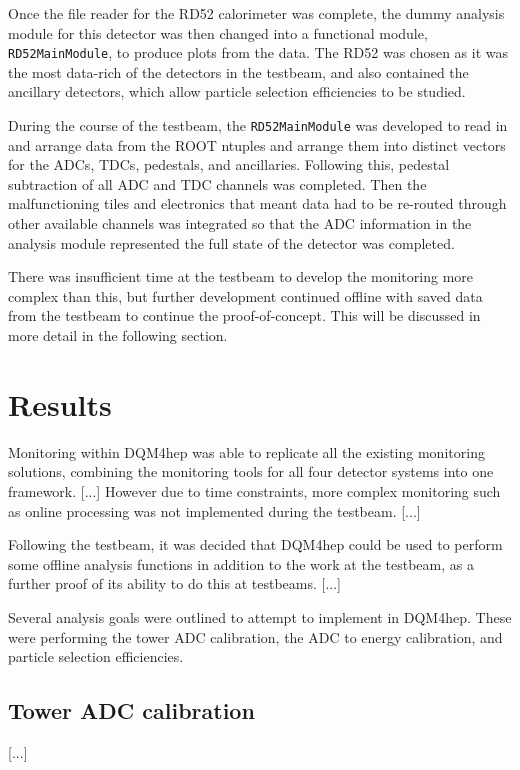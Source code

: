 Once the file reader for the RD52 calorimeter was complete, the dummy analysis module for this detector was then changed into a functional module, \texttt{RD52MainModule}, to produce plots from the data. The RD52 was chosen as it was the most data-rich of the detectors in the testbeam, and also contained the ancillary detectors, which allow particle selection efficiencies to be studied.

During the course of the testbeam, the \texttt{RD52MainModule} was developed to read in and arrange data from the ROOT ntuples and arrange them into distinct vectors for the \acrshort{ADC}s, \acrshort{TDC}s, pedestals, and ancillaries. Following this, pedestal subtraction of all \acrshort{ADC} and \acrshort{TDC} channels was completed. Then the malfunctioning tiles and electronics that meant data had to be re-routed through other available channels was integrated so that the \acrshort{ADC} information in the analysis module represented the full state of the detector was completed. 

There was insufficient time at the testbeam to develop the monitoring more complex than this, but further development continued offline with saved data from the testbeam to continue the proof-of-concept. This will be discussed in more detail in the following section.

\section{Results}
Monitoring within \acrshort{DQM4hep} was able to replicate all the existing monitoring solutions, combining the monitoring tools for all four detector systems into one framework. [...] However due to time constraints, more complex monitoring such as online processing was not implemented during the testbeam. [...] 

Following the testbeam, it was decided that \acrshort{DQM4hep} could be used to perform some offline analysis functions in addition to the work at the testbeam, as a further proof of its ability to do this at testbeams. [...]

Several analysis goals were outlined to attempt to implement in \acrshort{DQM4hep}. These were performing the tower \acrshort{ADC} calibration, the \acrshort{ADC} to energy calibration, and particle selection efficiencies. 

\subsection{Tower ADC calibration}
[...]

